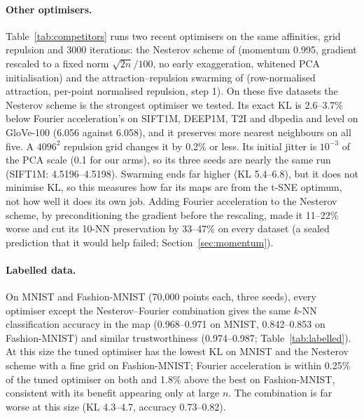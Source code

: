\documentclass[11pt]{article}
\begin{document}
\paragraph{Other optimisers.} Table~\ref{tab:competitors} runs two recent optimisers on the same affinities, grid
repulsion and 3000 iterations: the Nesterov scheme of \citet{lambert2023nesterov} (momentum 0.995, gradient
rescaled to a fixed norm $\sqrt{2n}/100$, no early exaggeration, whitened PCA initialisation) and the
attraction--repulsion swarming of \citet{lu2024swarming} (row-normalised attraction, per-point normalised
repulsion, step 1). On these five datasets the Nesterov scheme is the strongest optimiser we tested. Its exact KL is
2.6--3.7\% below Fourier acceleration's on SIFT1M, DEEP1M, T2I and dbpedia and level on GloVe-100 (6.056 against
6.058), and it preserves more nearest neighbours on all five. A $4096^2$ repulsion grid changes it by 0.2\% or
less. Its initial jitter is $10^{-3}$ of the PCA scale (0.1 for our arms), so its three seeds are nearly the same run
(SIFT1M: 4.5196--4.5198). Swarming ends far higher (KL 5.4--6.8), but it does not minimise KL, so this measures
how far its maps are from the t-SNE optimum, not how well it does its own job. Adding Fourier acceleration to the
Nesterov scheme, by preconditioning the gradient before the rescaling, made it 11--22\% worse and cut its 10-NN
preservation by 33--47\% on every dataset (a sealed prediction that it would help failed;
Section~\ref{sec:momentum}).
\begin{table}[t]\centering\small\resizebox{\linewidth}{!}{}
\caption{Optimisers at $\approx10^6$ points on the same affinities and repulsion: median exact KL after 3000
iterations / median 10-NN preservation. \emph{tuned} and Fourier as in Table~\ref{tab:main}; the others three
seeds (two where marked). The $4096^2$-grid variant was run only where it might matter and dropped once it did
not.}\label{tab:competitors}\end{table}

\paragraph{Labelled data.} On MNIST and Fashion-MNIST (70{,}000 points each, three seeds), every optimiser except the
Nesterov--Fourier combination gives the same $k$-NN classification accuracy in the map (0.968--0.971 on MNIST,
0.842--0.853 on Fashion-MNIST) and similar trustworthiness (0.974--0.987; Table~\ref{tab:labelled}). At this size the
tuned optimiser has the lowest KL on MNIST and the Nesterov scheme with a fine grid on Fashion-MNIST; Fourier
acceleration is within 0.25\% of the tuned optimiser on both and 1.8\% above the best on Fashion-MNIST, consistent
with its benefit appearing only at large $n$. The combination is far worse at this size (KL 4.3--4.7, accuracy
0.73--0.82).
\begin{table}[t]\centering\small\resizebox{0.9\linewidth}{!}{}
\caption{Labelled benchmarks (70{,}000 points, three seeds, medians): exact KL, 10-NN preservation, accuracy of a
10-NN classifier in the map (10{,}000 query points), and trustworthiness ($k=10$).}\label{tab:labelled}\end{table}
\end{document}
